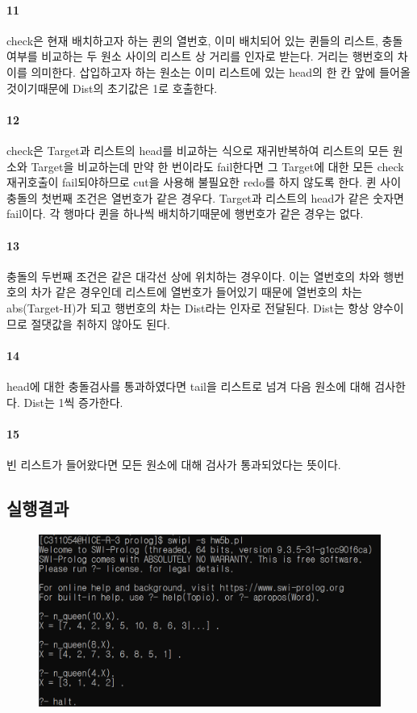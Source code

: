 \documentclass{oblivoir}
\begin{document}
\paragraph*{11}
check은 현재 배치하고자 하는 퀸의 열번호, 이미 배치되어 있는 퀸들의 리스트, 충돌여부를 비교하는 두 원소 사이의 리스트 상 거리를 인자로 받는다.
거리는 행번호의 차이를 의미한다. 삽입하고자 하는 원소는 이미 리스트에 있는 head의 한 칸 앞에 들어올 것이기때문에 Dist의 초기값은 1로 호출한다.

\paragraph*{12}
check은 Target과 리스트의 head를 비교하는 식으로 재귀반복하여 리스트의 모든 원소와 Target을 비교하는데 만약 한 번이라도 fail한다면 그 Target에 대한 모든 check 재귀호출이 fail되야하므로 cut을 사용해 불필요한 redo를 하지 않도록 한다.
퀸 사이 충돌의 첫번째 조건은 열번호가 같은 경우다. Target과 리스트의 head가 같은 숫자면 fail이다. 각 행마다 퀸을 하나씩 배치하기때문에 행번호가 같은 경우는 없다. 

\paragraph*{13}
충돌의 두번째 조건은 같은 대각선 상에 위치하는 경우이다. 이는 열번호의 차와 행번호의 차가 같은 경우인데 리스트에 열번호가 들어있기 때문에 열번호의 차는 abs(Target-H)가 되고 행번호의 차는 Dist라는 인자로 전달된다. Dist는 항상 양수이므로 절댓값을 취하지 않아도 된다. 

\paragraph*{14}
head에 대한 충돌검사를 통과하였다면 tail을 리스트로 넘겨 다음 원소에 대해 검사한다. Dist는 1씩 증가한다.

\paragraph*{15}
빈 리스트가 들어왔다면 모든 원소에 대해 검사가 통과되었다는 뜻이다.

\subsection{실행결과}
\begin{figure}[H]
  
    \includegraphics[width=0.5\linewidth]{result_b.PNG}
   
\end{figure}
\end{document}
